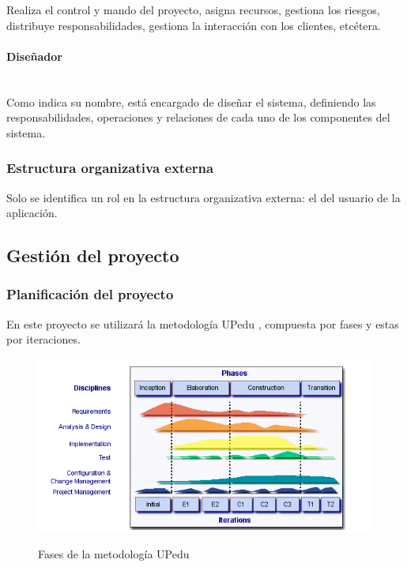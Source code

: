 \documentclass[twoside]{report}
\begin{document}
Realiza el control y mando del proyecto, asigna recursos, gestiona los riesgos, distribuye responsabilidades, gestiona la interacción con los clientes, etcétera.

\paragraph{Diseñador}\mbox{}\\

Como indica su nombre, está encargado de diseñar el sistema, definiendo las responsabilidades, operaciones y relaciones de cada uno de los componentes del sistema.

\subsubsection{Estructura organizativa externa}
Solo se identifica un rol en la estructura organizativa externa: el del usuario de la aplicación. 

\subsection{Gestión del proyecto}
\subsubsection{Planificación del proyecto}
En este proyecto se utilizará la metodología UPedu \cite{upedu}, compuesta por fases y estas por iteraciones.

\begin{figure}[h]
\begin{center}
\includegraphics[scale=0.75]{images/upeduFases}
\caption{Fases de la metodología UPedu} 
\label{upeduChart}
\cite{upedu}
\end{center}
\end{figure}
\end{document}

